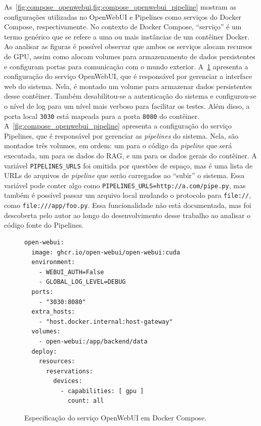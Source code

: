 \documentclass[journal]{IEEEtran}
\begin{document}
As~\cref{fig:compose_openwebui,fig:compose_openwebui_pipeline} mostram as configurações utilizadas no OpenWebUI e Pipelines como serviços do Docker Compose, respectivamente.
No contexto de Docker Compose, ``serviço'' é um termo genérico que se refere a uma ou mais instâncias de um contêiner Docker.
Ao analisar as figuras é possível observar que ambos os serviços alocam recursos de GPU, assim como alocam volumes para armazenamento de dados persistentes e configuram portas para comunicação com o mundo exterior.
A~\cref{fig:compose_openwebui} apresenta a configuração do serviço OpenWebUI, que é responsável por gerenciar a interface web do sistema.
Nela, é montado um volume para armazenar dados persistentes desse contêiner.
Também desabilitou-se a autenticação do sistema e configurou-se o nível de log para um nível mais verboso para facilitar os testes.
Além disso, a porta local \texttt{3030} está mapeada para a porta \texttt{8080} do contêiner.
A~\cref{fig:compose_openwebui_pipeline} apresenta a configuração do serviço Pipelines, que é responsável por gerenciar as \textit{pipelines} do sistema.
Nela, são montados três volumes, em ordem: um para o código da \textit{pipeline} que será executada, um para os dados do RAG, e um para os dados gerais do contêiner.
A variável \texttt{PIPELINES\_URLS} foi omitida por questões de espaço, mas é uma lista de URLs de arquivos de \textit{pipeline} que serão carregados ao ``subir'' o sistema.
Essa variável pode conter algo como \texttt{PIPELINES\_URLS=http://a.com/pipe.py}, mas também é possível passar um arquivo local mudando o protocolo para \texttt{file://}, como \texttt{file:///app/foo.py}.
Essa funcionalidade não está documentada, mas foi descoberta pelo autor ao longo do desenvolvimento desse trabalho ao analisar o código fonte do Pipelines.

\begin{figure}[!ht]
    \centering
    \begin{verbatim}
open-webui:
  image: ghcr.io/open-webui/open-webui:cuda
  environment:
    - WEBUI_AUTH=False
    - GLOBAL_LOG_LEVEL=DEBUG
  ports:
    - "3030:8080"
  extra_hosts:
    - "host.docker.internal:host-gateway"
  volumes:
    - open-webui:/app/backend/data
  deploy:
    resources:
      reservations:
        devices:
          - capabilities: [ gpu ]
            count: all
    \end{verbatim}
    \caption{Especificação do serviço OpenWebUI em Docker Compose.\label{fig:compose_openwebui}}
\end{figure}
\end{document}
